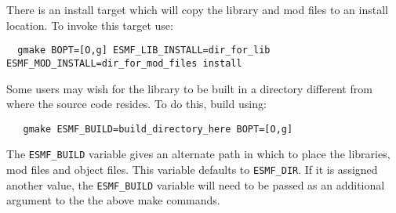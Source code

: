 There is an install target which will copy the library and mod files to an
install location.  To invoke this target use:
\begin{verbatim}
  gmake BOPT=[O,g] ESMF_LIB_INSTALL=dir_for_lib ESMF_MOD_INSTALL=dir_for_mod_files install 
\end{verbatim}

Some users may wish for the library to be built in a directory different from 
where the source code resides.  To do this, build using:
\begin{verbatim}
   gmake ESMF_BUILD=build_directory_here BOPT=[O,g]
\end{verbatim}

The {\tt ESMF\_BUILD} variable gives an alternate path in which to place the libraries,
mod files and object files.  This variable defaults to {\tt ESMF\_DIR}.  If it is 
assigned another value, the {\tt ESMF\_BUILD} variable will need to be passed as
an additional argument to the the above make commands.

